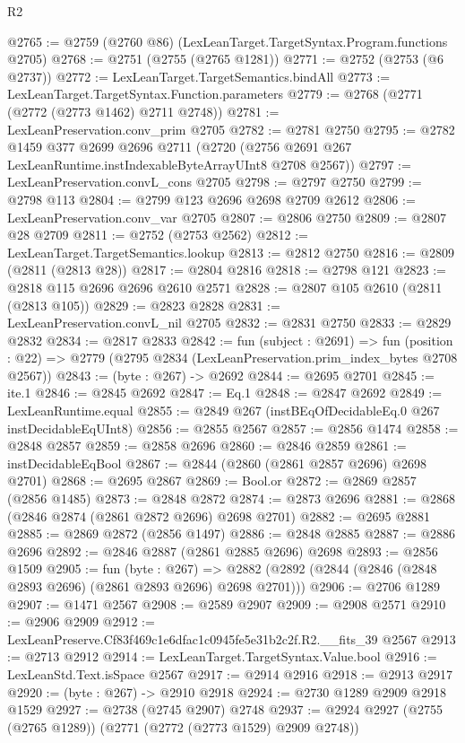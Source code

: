 \begin{lexlean}{R2}
\begin{coremodule}
@2765 := @2759 (@2760 @86) (LexLeanTarget.TargetSyntax.Program.functions @2705)
@2768 := @2751 (@2755 (@2765 @1281))
@2771 := @2752 (@2753 (@6 @2737))
@2772 := LexLeanTarget.TargetSemantics.bindAll
@2773 := LexLeanTarget.TargetSyntax.Function.parameters
@2779 := @2768 (@2771 (@2772 (@2773 @1462) @2711 @2748))
@2781 := LexLeanPreservation.conv_prim @2705
@2782 := @2781 @2750
@2795 := @2782
    @1459
    @377
    @2699
    @2696
    @2711
    (@2720 (@2756 @2691 @267 LexLeanRuntime.instIndexableByteArrayUInt8 @2708 @2567))
@2797 := LexLeanPreservation.convL_cons @2705
@2798 := @2797 @2750
@2799 := @2798 @113
@2804 := @2799 @123 @2696 @2698 @2709 @2612
@2806 := LexLeanPreservation.conv_var @2705
@2807 := @2806 @2750
@2809 := @2807 @28 @2709
@2811 := @2752 (@2753 @2562)
@2812 := LexLeanTarget.TargetSemantics.lookup
@2813 := @2812 @2750
@2816 := @2809 (@2811 (@2813 @28))
@2817 := @2804 @2816
@2818 := @2798 @121
@2823 := @2818 @115 @2696 @2696 @2610 @2571
@2828 := @2807 @105 @2610 (@2811 (@2813 @105))
@2829 := @2823 @2828
@2831 := LexLeanPreservation.convL_nil @2705
@2832 := @2831 @2750
@2833 := @2829 @2832
@2834 := @2817 @2833
@2842 := fun (subject : @2691) =>
  fun (position : @22) => @2779 (@2795 @2834 (LexLeanPreservation.prim_index_bytes @2708 @2567))
@2843 := (byte : @267) -> @2692
@2844 := @2695 @2701
@2845 := ite.{1}
@2846 := @2845 @2692
@2847 := Eq.{1}
@2848 := @2847 @2692
@2849 := LexLeanRuntime.equal
@2855 := @2849 @267 (instBEqOfDecidableEq.{0} @267 instDecidableEqUInt8)
@2856 := @2855 @2567
@2857 := @2856 @1474
@2858 := @2848 @2857
@2859 := @2858 @2696
@2860 := @2846 @2859
@2861 := instDecidableEqBool
@2867 := @2844 (@2860 (@2861 @2857 @2696) @2698 @2701)
@2868 := @2695 @2867
@2869 := Bool.or
@2872 := @2869 @2857 (@2856 @1485)
@2873 := @2848 @2872
@2874 := @2873 @2696
@2881 := @2868 (@2846 @2874 (@2861 @2872 @2696) @2698 @2701)
@2882 := @2695 @2881
@2885 := @2869 @2872 (@2856 @1497)
@2886 := @2848 @2885
@2887 := @2886 @2696
@2892 := @2846 @2887 (@2861 @2885 @2696) @2698
@2893 := @2856 @1509
@2905 := fun (byte : @267) =>
  @2882 (@2892 (@2844 (@2846 (@2848 @2893 @2696) (@2861 @2893 @2696) @2698 @2701)))
@2906 := @2706 @1289
@2907 := @1471 @2567
@2908 := @2589 @2907
@2909 := @2908 @2571
@2910 := @2906 @2909
@2912 := LexLeanPreserve.Cf83f469c1e6dfac1c0945fe5e31b2c2f.R2.__fits_39 @2567
@2913 := @2713 @2912
@2914 := LexLeanTarget.TargetSyntax.Value.bool
@2916 := LexLeanStd.Text.isSpace @2567
@2917 := @2914 @2916
@2918 := @2913 @2917
@2920 := (byte : @267) -> @2910 @2918
@2924 := @2730 @1289 @2909 @2918 @1529
@2927 := @2738 (@2745 @2907) @2748
@2937 := @2924 @2927 (@2755 (@2765 @1289)) (@2771 (@2772 (@2773 @1529) @2909 @2748))

\end{coremodule}
\end{lexlean}
